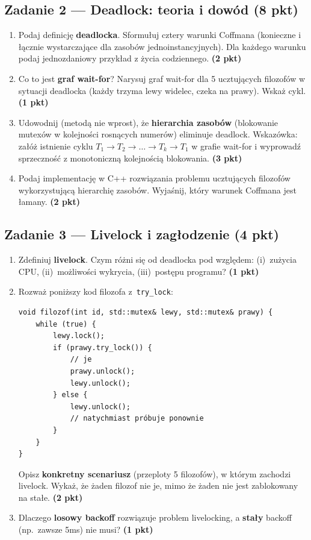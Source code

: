 \documentclass[11pt,a4paper]{article}
\newcommand{\pkt}[1]{\hfill\textbf{(#1 pkt)}}
\begin{document}
\subsection*{Zadanie 2 --- Deadlock: teoria i dowód \pkt{8}}

\begin{enumerate}[label=(\alph*)]
\item Podaj definicję \textbf{deadlocka}. Sformułuj cztery warunki Coffmana (konieczne i łącznie wystarczające dla zasobów jednoinstancyjnych). Dla każdego warunku podaj jednozdaniowy przykład z życia codziennego. \pkt{2}

\item Co to jest \textbf{graf wait-for}? Narysuj graf wait-for dla 5 ucztujących filozofów w sytuacji deadlocka (każdy trzyma lewy widelec, czeka na prawy). Wskaż cykl. \pkt{1}

\item Udowodnij (metodą nie wprost), że \textbf{hierarchia zasobów} (blokowanie mutexów w kolejności rosnących numerów) eliminuje deadlock. Wskazówka: załóż istnienie cyklu $T_1 \to T_2 \to \ldots \to T_k \to T_1$ w grafie wait-for i wyprowadź sprzeczność z monotoniczną kolejnością blokowania. \pkt{3}

\item Podaj implementację w C++ rozwiązania problemu ucztujących filozofów wykorzystującą hierarchię zasobów. Wyjaśnij, który warunek Coffmana jest łamany. \pkt{2}
\end{enumerate}

\subsection*{Zadanie 3 --- Livelock i zagłodzenie \pkt{4}}

\begin{enumerate}[label=(\alph*)]
\item Zdefiniuj \textbf{livelock}. Czym różni się od deadlocka pod względem: (i)~zużycia CPU, (ii)~możliwości wykrycia, (iii)~postępu programu? \pkt{1}

\item Rozważ poniższy kod filozofa z~\texttt{try\_lock}:
\begin{lstlisting}
void filozof(int id, std::mutex& lewy, std::mutex& prawy) {
    while (true) {
        lewy.lock();
        if (prawy.try_lock()) {
            // je
            prawy.unlock();
            lewy.unlock();
        } else {
            lewy.unlock();
            // natychmiast próbuje ponownie
        }
    }
}
\end{lstlisting}
Opisz \textbf{konkretny scenariusz} (przeploty 5 filozofów), w którym zachodzi livelock. Wykaż, że żaden filozof nie je, mimo że żaden nie jest zablokowany na stałe. \pkt{2}

\item Dlaczego \textbf{losowy backoff} rozwiązuje problem livelocking, a \textbf{stały} backoff (np.\ zawsze 5ms) nie musi? \pkt{1}
\end{enumerate}
\end{document}
